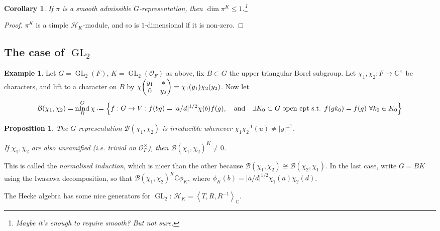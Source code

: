 \documentclass[11pt]{report}
\let\mc\mathcal
\newcommand{\1}{\mathbbm 1}
\newcommand{\C}{\mathbb{C}}
\renewcommand{\O}{\mc O}
\newcommand*{\defeq}{\mathrel{\vcenter{\baselineskip0.5ex \lineskiplimit0pt
      \hbox{\scriptsize.}\hbox{\scriptsize.}}}%
  =}
\DeclareMathOperator{\nInd}{nInd}
\DeclareMathOperator{\GL}{GL}
\theoremstyle{plain}
\newcounter{ex}
\newtheorem{cor}[thm]{Corollary}
\newtheorem{prop}[thm]{Proposition}
\theoremstyle{definition}
\newtheorem{example}[thm]{Example}
\theoremstyle{remark}
\numberwithin{equation}{section}
\begin{document}
\begin{cor}
  If $\pi$ is a smooth admissible $G$-representation, then $\dim \pi^{K}
  \le 1$.\footnote{Maybe it's enough to require smooth? But not sure.}
\end{cor}
\begin{proof}
  $\pi^{K}$ is a simple $\mc H_{K}$-module, and so is $1$-dimensional if
  it is non-zero.
\end{proof}

\subsection{The case of \texorpdfstring{$\GL_{2}$}{GL2}}
\label{sec:hecke-GL2}

\begin{example}
  Let $G = \GL_{2}(F)$, $K = \GL_{2}(\O_{F})$ as above, fix $B \subset G$
  the upper triangular Borel subgroup. Let $\chi_{1},\chi_{2} \colon F \to
  \C^{\times}$ be characters, and lift to a character on $B$ by $\chi
  \mqty(y_{1}  & \ast \\ 0 & y_{2}) = \chi_{1}(y_{1})\chi_{2}(y_{2})$. Now let
  \begin{equation}
    \label{eq:10}
    \mc B(\chi_{1},\chi_{2}) = \nInd_{B}^{G}\chi \defeq \qty{f : G \to V : f(bg)
    = |a/d|^{1/2}\chi(b)f(g), \qq{and} \exists K_{0} \subset G \text{ open cpt s.t. }
   f(gk_{0}) = f(g) \ \forall k_{0} \in K_{0}}
  \end{equation}
\end{example}
\begin{prop}
  The $G$-representation $\mc B(\chi_{1},\chi_{2})$ is irreducible whenever
  $\chi_{1}\chi_{2}^{-1}(u) \ne |y|^{\pm 1}$.

  If $\chi_{1},\chi_{2}$ are also unramified (i.e. trivial on $\O_{F}^{\times}$), then
  $\mc B(\chi_{1},\chi_{2})^{K} \ne 0$. 
\end{prop}
This is called the \emph{normalised induction}, which is nicer than
the other because
$\mc B(\chi_{1},\chi_{2}) \cong \mc B(\chi_{2},\chi_{1})$.  In the last case, write
$G = BK$ using the Iwasawa decomposition, so that
$\mc B(\chi_{1},\chi_{2})^{K} \C \phi_{K}$, where
$\phi_{K}(b) = |a/d|^{1/2}\chi_{1}(a)\chi_{2}(d)$.

The Hecke algebra has some nice generators for $\GL_{2}$:
$\mc H_{K} = \left\langle T,R,R^{-1} \right\rangle_{\C}$.
\end{document}

